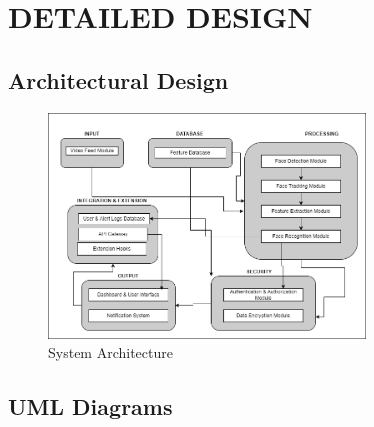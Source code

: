 \chapter{DETAILED DESIGN}

\section{Architectural Design}
	\begin{figure}[h!]
		\centering
		\includegraphics[width=0.75\textwidth]{components/images/sys-arch.png}
		\caption{System Architecture}
		\label{fig:sys-arch}
	\end{figure}

\section{UML Diagrams}

